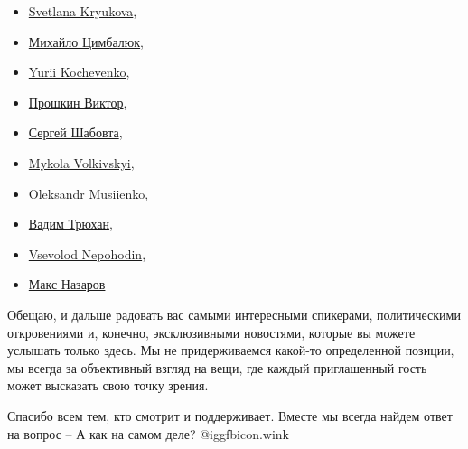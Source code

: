 \begin{multicols}{3}
\begin{itemize}
  \item \href{https://www.facebook.com/kryukova}{Svetlana Kryukova},
  \item \href{https://www.facebook.com/myhaylocymbalyk}{Михайло Цимбалюк}, 
  \item \href{https://www.facebook.com/Kochevenko}{Yurii Kochevenko}, 
  \item \href{https://www.facebook.com/profile.php?id=100046439387901}{Прошкин Виктор}, 
  \item \href{https://www.facebook.com/profile.php?id=100023534419447}{Сергей Шабовта}, 
  \item \href{https://www.facebook.com/nickolas.volkovski}{Mykola Volkivskyi}, 
  \item Oleksandr Musiienko, 
  \item \href{https://www.facebook.com/vadymholub}{Вадим Трюхан}, 
  \item \href{https://www.facebook.com/npgd101}{Vsevolod Nepohodin},
  \item \href{https://www.facebook.com/maks.nazaroff}{Макс Назаров}
\end{itemize}
\end{multicols}

Обещаю, и дальше радовать вас самыми интересными спикерами, политическими
откровениями и, конечно, эксклюзивными новостями, которые вы можете услышать
только здесь. Мы не придерживаемся какой-то определенной позиции, мы всегда за
объективный взгляд на вещи, где каждый приглашенный гость может высказать свою
точку зрения.

Спасибо всем тем, кто смотрит и поддерживает. Вместе мы всегда найдем ответ на
вопрос – А как на самом деле?  @igg{fbicon.wink} 

